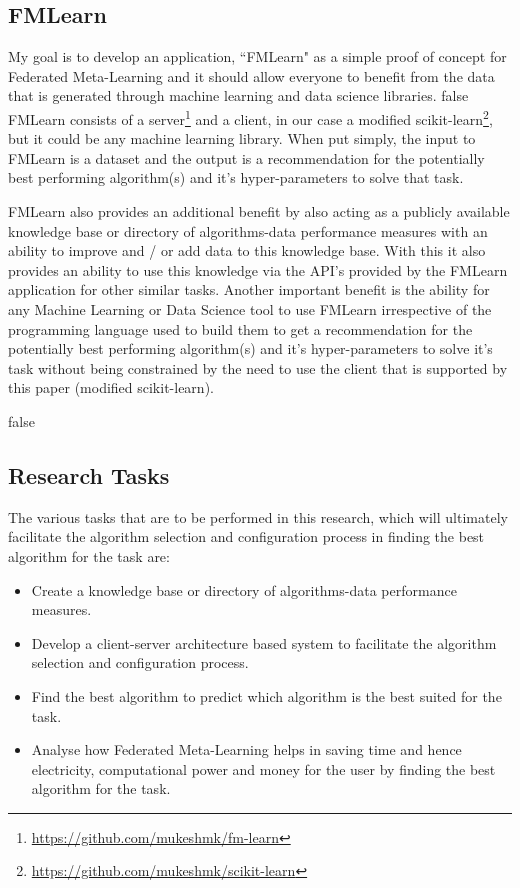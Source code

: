 \subsection{FMLearn}
My goal is to develop an application, “FMLearn" as a simple proof of concept for Federated Meta-Learning and it should allow everyone to benefit from the data that is generated through machine learning and data science libraries. 
\if false
FMLearn consists of a server\footnote{\url{https://github.com/mukeshmk/fm-learn}} and a client, in our case a modified scikit-learn\footnote{\url{https://github.com/mukeshmk/scikit-learn}}, but it could be any machine learning library.
\fi
When put simply, the input to FMLearn is a dataset and the output is a recommendation for the potentially best performing algorithm(s) and it's hyper-parameters to solve that task.

FMLearn also provides an additional benefit by also acting as a publicly available knowledge base or directory of algorithms-data performance measures with an ability to improve and / or add data to this knowledge base. With this it also provides an ability to use this knowledge via the API's provided by the FMLearn application for other similar tasks. Another important benefit is the ability for any Machine Learning or Data Science tool to use FMLearn irrespective of the programming language used to build them to get a recommendation for the potentially best performing algorithm(s) and it's hyper-parameters to solve it's task without being constrained by the need to use the client that is supported by this paper (modified scikit-learn).

\if false

\subsection{Research Tasks}
The various tasks that are to be performed in this research, which will ultimately facilitate the algorithm selection and configuration process in finding the best algorithm for the task are:

\begin{itemize}
    \item Create a knowledge base or directory of algorithms-data performance measures.
    \item Develop a client-server architecture based system to facilitate the algorithm selection and configuration process.
    \item Find the best algorithm to predict which algorithm is the best suited for the task.
    \item Analyse how Federated Meta-Learning helps in saving time and hence electricity, computational power and money for the user by finding the best algorithm for the task.
\end{itemize}

